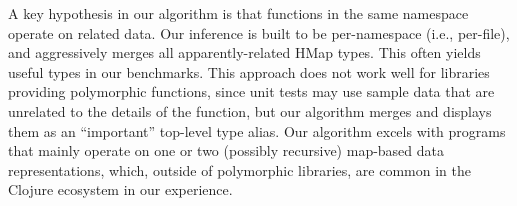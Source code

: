 \begin{figure}
\end{figure}



A key hypothesis in our algorithm is that functions in the same
namespace operate on related data. Our inference is built
to be per-namespace (i.e., per-file),
and aggressively merges all apparently-related HMap types.
This often yields useful types in our benchmarks.
This approach does not work well for libraries providing polymorphic
functions, since unit tests may use sample data that are unrelated
to the details of the function, but our algorithm merges and displays
them as an ``important'' top-level type alias.
Our algorithm excels
with programs that mainly operate on one or two (possibly recursive) map-based
data representations,
which, outside of polymorphic libraries, are common in the Clojure ecosystem
in our experience.

%


